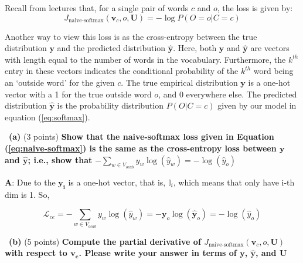 \documentclass[a4 paper]{article}
\newcommand{\subproblem}[1]{~\newline\textbf{(#1)}}
\newcommand{\bb}[1]{$\boldsymbol{#1}$}
\begin{document}
Recall from lectures that, for a single pair of words $c$ and $o$, the loss is given by:
\begin{equation}
    J_{\text {naive-softmax}}\left(\boldsymbol{v}_{c}, o, \boldsymbol{U}\right) = -\log P(O=o | C=c)
    \label{eq:naive-softmax}
\end{equation}

Another way to view this loss is as the cross-entropy between the true distribution \bb{y} and the predicted distribution \bb{\hat{y}}.
Here, both \bb{y} and \bb{\hat{y}} are vectors with length equal to the number of words in the vocabulary.
Furthermore, the $k^{th}$ entry in these vectors indicates the conditional probability of the $k^{th}$ word being an `outside word' for the given $c$.
The true empirical distribution \bb{y} is a one-hot vector with a 1 for the true outside word $o$, and 0 everywhere else.
The predicted distribution \bb{\hat{y}} is the probability distribution $P(O|C = c)$ given by our model in equation (\ref{eq:softmax}).

\subproblem{a} (3 points) \textbf{Show that the naive-softmax loss given in Equation (\ref{eq:naive-softmax}) is the same as the cross-entropy loss between \bb{y} and \bb{\hat{y}}; i.e., show that} $-\sum_{w \in V_{ocab}} y_{w} \log \left(\hat{y}_{w}\right)=-\log \left(\hat{y}_{o}\right)$

\textbf{A}: Due to the \bb{y_i} is a one-hot vector, that is, $\mathbb{I}_{i}$, which means that only have i-th dim is 1.
So,

\begin{equation}
    \mathcal{L}_{ce} = -\sum_{w \in V_{ocab}} y_{w} \log \left(\hat{y}_{w}\right)= -\boldsymbol{y}_o\log \left(\boldsymbol{\hat{y}}_{o}\right) = -\log \left(\hat{y}_{o}\right)
\end{equation}

\subproblem{b} (5 points) \textbf{Compute the partial derivative of $J_{\text {naive-softmax}}\left(\boldsymbol{v}_{c}, o, \boldsymbol{U}\right)$ with respect to \bb{v_c}. Please write your answer in terms of \bb{y}, \bb{\hat{y}}, and \bb{U}}
\end{document}
